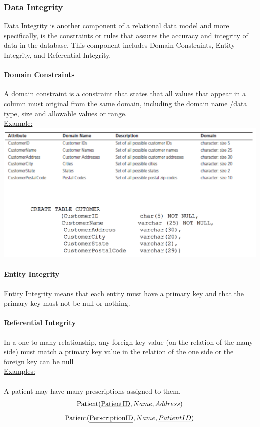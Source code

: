\documentclass[12pt]{article}
\begin{document}
\subsubsection{Data Integrity}

Data Integrity is another component of a relational data model and more specifically, is the constraints or rules that assures the accuracy and integrity of data in the database. This component includes Domain Constraints, Entity Integrity, and Referential Integrity.

\paragraph{Domain Constraints} A domain constraint is a constraint that states that all values that appear in a column must original from the same domain, including the domain name \slash  data type, size and allowable values or range.
\\
\underline{Example:}\\
\includegraphics[scale=0.5]{lec4-3}

\paragraph{Entity Integrity} Entity Integrity means that each entity must have a primary key and that the primary key must not be null or nothing.

\paragraph{Referential Integrity} In a one to many relationship, any foreign key value (on the relation of the many side) must match a primary key value in the relation of the one side or the foreign key can be null
\\
\underline{Examples:}\\
\\
A patient may have many prescriptions assigned to them.
$$\text{Patient(\underline{PatientID}}, Name, Address)$$
$$\text{Patient(\underline{PerscriptionID}}, Name, \underline{PatientID})$$
\end{document}
